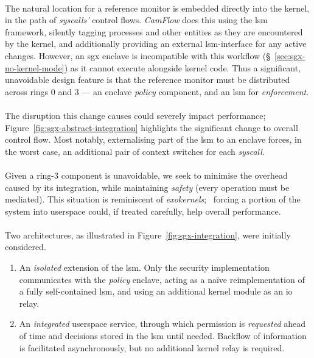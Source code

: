 \paragraph{} The natural location for a reference monitor is embedded directly into the kernel, in the path of \textit{syscalls'} control flows. \textit{CamFlow} does this using the \acrshort{lsm} framework, silently tagging processes and other entities as they are encountered by the kernel, and additionally providing an external \acrshort{lsm}-interface for any active changes. However, an \acrshort{sgx} enclave is incompatible with this workflow (§~\ref{sec:sgx-no-kernel-mode}) as it cannot execute alongside kernel code. Thus a significant, unavoidable design feature is that the reference monitor must be distributed across rings 0 and 3 --- an enclave \textit{policy} component, and an \acrshort{lsm} for \textit{enforcement}.

\paragraph{} The disruption this change causes could severely impact performance; Figure~\ref{fig:sgx-abstract-integration} highlights the significant change to overall control flow. Most notably, externalising part of the \acrshort{lsm} to an enclave forces, in the worst case, an additional pair of context switches for each \textit{syscall}.

\paragraph{} Given a ring-3 component is unavoidable, we seek to minimise the overhead caused by its integration, while maintaining \textit{safety} (every operation must be mediated). This situation is reminiscent of \textit{exokernels};~\cite{10.1145/224056.224076} forcing a portion of the system into userspace could, if treated carefully, help overall performance.~\cite{10.1145/269005.266644} 

\paragraph{} Two architectures, as illustrated in Figure~\ref{fig:sgx-integration}, were initially considered. 

\begin{enumerate}
    \item An \textit{isolated} extension of the \acrshort{lsm}. Only the security implementation communicates with the \textit{policy} enclave, acting as a na\"{i}ve reimplementation of a fully self-contained \acrshort{lsm}, and using an additional kernel module as an \acrshort{io} relay.
    \item An \textit{integrated} userspace service, through which permission is \textit{requested} ahead of time and decisions stored in the \acrshort{lsm} until needed. Backflow of information is facilitated asynchronously, but no additional kernel relay is required.
\end{enumerate}



